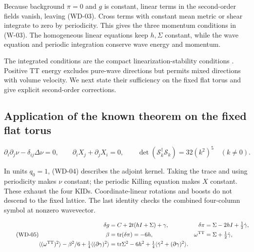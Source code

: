 Because background $\pi=0$ and $g$ is constant, linear terms in the second-order fields vanish, leaving (WD-03). Cross terms with constant mean metric or shear integrate to zero by periodicity. This gives the three momentum conditions in (W-03). The homogeneous linear equations keep $h,\Sigma$ constant, while the wave equation and periodic integration conserve wave energy and momentum.

The integrated conditions are the compact linearization-stability conditions \cite{BrillDeser1973,ArmsMarsdenMoncrief1982}. Positive TT energy excludes pure-wave directions but permits mixed directions with volume velocity. We next state their sufficiency on the fixed flat torus and give explicit second-order corrections.


\subsection{Application of the known theorem on the fixed flat torus}

\begin{equation}\tag{WD-04}\label{eq:WD-04}
\partial_i\partial_j\nu-\delta_{ij}\Delta\nu=0,\qquad
\partial_iX_j+\partial_jX_i=0,\qquad
\det(\mathcal S_k^\dagger\mathcal S_k)=32(k^2)^5\quad(k\ne0).
\end{equation}

In units $q_0=1$, (WD-04) describes the adjoint kernel. Taking the trace and using periodicity makes $\nu$ constant; the periodic Killing equation makes $X$ constant. These exhaust the four KIDs. Coordinate-linear rotations and boosts do not descend to the fixed lattice. The last identity checks the combined four-column symbol at nonzero wavevector.

\begin{equation}\tag{WD-05}\label{eq:WD-05}
\begin{aligned}
\delta g&=C+2t(hI+\Sigma)+\gamma, &\delta\pi&=\Sigma-2hI+\tfrac12\dot\gamma,\\
\beta&=\mathrm{tr}(\delta\pi)=-6h,&\omega^{\rm TT}&=\Sigma+\tfrac12\dot\gamma,\\
\langle(\omega^{\rm TT})^2\rangle-\beta^2/6
+\tfrac14\langle(\partial\gamma)^2\rangle
&=\mathrm{tr}\Sigma^2-6h^2+\tfrac14\langle\dot\gamma^2+(\partial\gamma)^2\rangle.
\end{aligned}
\end{equation}

